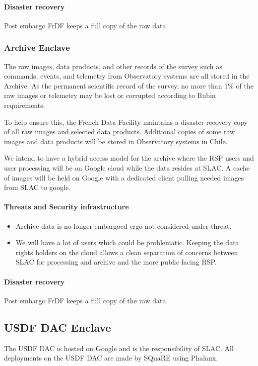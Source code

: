 \paragraph{Disaster recovery}
Post embargo FrDF keeps a full copy of the raw data.

\subsubsection{ \gls{Archive}  Enclave}
The raw images, data products, and other records of the survey such as commands, events, and telemetry from Observatory systems are all stored in the \gls{Archive}.
As the permanent scientific record of the survey, no more than 1\% of the raw images or telemetry may be lost or corrupted according to Rubin requirements.

To help ensure this, the French Data Facility maintains a disaster recovery copy of all raw images and selected data products. Additional copies of some raw images and data products will be stored in Observatory systems in Chile.

We intend to have a hybrid access model for the archive where  the \gls{RSP} users and user processing will be on Google cloud while the data resides at SLAC. A cache of images will be held on Google with a dedicated client pulling needed images from SLAC to google.


\paragraph{ Threats and Security infrastructure}

\begin{itemize}
\item Archive data is no longer embargoed ergo not considered under threat.
\item We will have a lot of users which could be problematic. Keeping the data rights holders on the cloud allows a clean separation of concerns between SLAC for processing and archive and the more public facing \gls{RSP}.
\end{itemize}
\paragraph{Disaster recovery}
Post embargo FrDF keeps a full copy of the raw data.



\subsection{ USDF \gls{DAC} Enclave}
The USDF DAC is hosted on Google and  is the responsibility of SLAC.
All deployments on the USDF DAC are made by SQuaRE using Phalanx.

